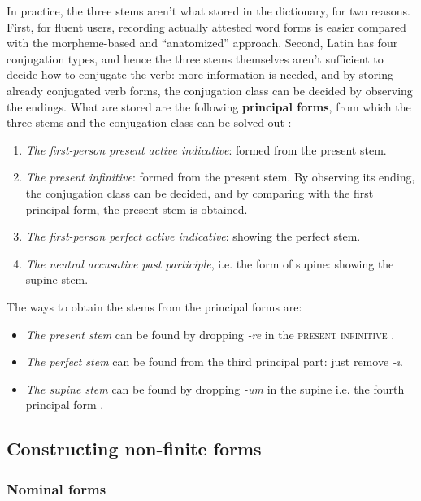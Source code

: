 \documentclass[a4paper, oneside]{report}
\newcommand*{\citesec}[1]{\S~{#1}}
\newcommand*{\concept}[1]{\textbf{#1}}
\newcommand{\form}[1]{\emph{#1}}
\newcommand*{\category}[1]{\textsc{#1}}
\begin{document}
In practice, the three stems aren't what stored in the dictionary,
for two reasons.
First, for fluent users,
recording actually attested word forms is easier
compared with the morpheme-based and ``anatomized'' approach.
Second, Latin has four conjugation types,
and hence the three stems themselves aren't sufficient to decide how to conjugate the verb:
more information is needed, 
and by storing already conjugated verb forms,
the conjugation class can be decided by observing the endings.
What are stored are the following \concept{principal forms},
from which the three stems and the conjugation class can be solved out
\citep[\citesec{172}]{allen1903allen}:
\begin{enumerate}
    \item \emph{The first-person present active indicative}: formed from the present stem.
    \item \emph{The present infinitive}: formed from the present stem. 
    By observing its ending, the conjugation class can be decided,
    and by comparing with the first principal form, 
    the present stem is obtained.
    \item \emph{The first-person perfect active indicative}: showing the perfect stem.
    \item \emph{The neutral accusative past participle}, i.e. the form of supine: showing the supine stem.
\end{enumerate}
The ways to obtain the stems from the principal forms are:
\begin{itemize}
    \item \emph{The present stem} can be found by dropping \form{-re} in the 
    \category{present infinitive}
    \citep[\citesec{175}]{allen1903allen}.
    \item \emph{The perfect stem} can be found from the third principal part:
    just remove \form{-ī}.
    \item \emph{The supine stem} can be found by dropping \form{-um} in the supine
    i.e. the fourth principal form
    \citep[\citesec{178}]{allen1903allen}.
\end{itemize}

\subsection{Constructing non-finite forms}

\subsubsection{Nominal forms}
\end{document}
